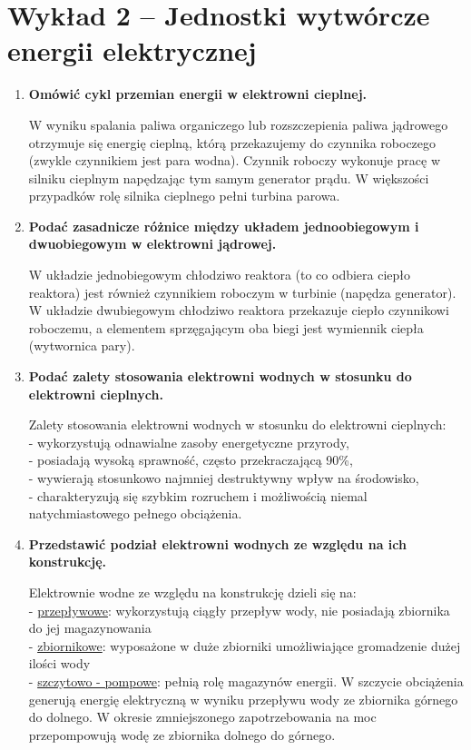 \documentclass[12pt]{article}
\begin{document}
\section{Wykład 2 -- Jednostki wytwórcze energii elektrycznej}
\begin{enumerate}
    \item \textbf{Omówić cykl przemian energii w elektrowni cieplnej.}

        W wyniku spalania paliwa organiczego lub rozszczepienia paliwa jądrowego otrzymuje się energię cieplną,
        którą przekazujemy do czynnika roboczego (zwykle czynnikiem jest para wodna). Czynnik roboczy wykonuje pracę 
        w silniku cieplnym napędzając tym samym generator prądu. W większości przypadków rolę silnika cieplnego pełni turbina parowa.

    \item \textbf{Podać zasadnicze różnice między układem jednoobiegowym i dwuobiegowym w elektrowni jądrowej.}
    
        W układzie jednobiegowym chłodziwo reaktora (to co odbiera ciepło reaktora) jest również czynnikiem roboczym
        w turbinie (napędza generator).\\
        W układzie dwubiegowym chłodziwo reaktora przekazuje ciepło czynnikowi roboczemu, a elementem sprzęgającym
        oba biegi jest wymiennik ciepła (wytwornica pary).

    \item \textbf{Podać zalety stosowania elektrowni wodnych w stosunku do elektrowni cieplnych.}

        Zalety stosowania elektrowni wodnych w stosunku do elektrowni cieplnych:\\
        - wykorzystują odnawialne zasoby energetyczne przyrody,\\
        - posiadają wysoką sprawność, często przekraczającą 90\%,\\
        - wywierają stosunkowo najmniej destruktywny wpływ na środowisko,\\
        - charakteryzują się szybkim rozruchem i możliwością niemal natychmiastowego pełnego obciążenia.
    
    \item \textbf{Przedstawić podział elektrowni wodnych ze względu na ich konstrukcję.}
    
        Elektrownie wodne ze względu na konstrukcję dzieli się na:\\
        - \underline{przepływowe}: wykorzystują ciągły przepływ wody, nie posiadają zbiornika do jej magazynowania\\
        - \underline{zbiornikowe}: wyposażone w duże zbiorniki umożliwiające gromadzenie dużej ilości wody\\
        - \underline{szczytowo - pompowe}: pełnią rolę magazynów energii. W szczycie obciążenia generują energię elektryczną w wyniku
        przepływu wody ze zbiornika górnego do dolnego. W okresie zmniejszonego zapotrzebowania na moc przepompowują
        wodę ze zbiornika dolnego do górnego.


\end{enumerate}
\end{document}
